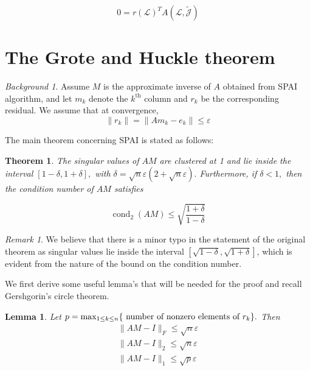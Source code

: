\documentclass[paper=A4, fontsize=11pt]{scrartcl}
\let\originalleft\left
\let\originalright\right
\renewcommand{\left}{\mathopen{}\mathclose\bgroup\originalleft}
\renewcommand{\right}{\aftergroup\egroup\originalright}
\newtheorem{lemma}{Lemma}[section]
\newtheorem{theorem}{Theorem}[section]
\theoremstyle{remark}
\newtheorem*{rem}{Remark}
\newtheorem*{bgd}{Background}
\begin{document}
\begin{equation}
0=r(\mathcal{L})^{T} A(\mathcal{L}, \tilde{\mathcal{J}})
\end{equation}

\newpage
	
	
\section{The Grote and Huckle theorem}

\begin{bgd} Assume $M$ is the approximate inverse of $A$ obtained from SPAI algorithm, and let $m_k$ denote the $k^{\text{th}}$ column and $r_k$ be the corresponding residual. We assume that at convergence, 
\begin{equation}\label{eq:conv}
\| r_k\| = \|A m_k- e_k\| \leq  \varepsilon 
\end{equation}
\end{bgd}
The main theorem concerning SPAI is stated as follows: 
\begin{theorem}
The singular values of \(A M\) are clustered at 1 and lie inside the
interval \([1-\delta, 1+\delta],\) with \(\delta=\sqrt{n} \varepsilon(2+\sqrt{n} \varepsilon) .\) Furthermore, if \(\delta<1,\) then the
condition number of \(A M\) satisfies

\begin{equation}
\operatorname{cond}_{2}(A M) \leq \sqrt{\frac{1+\delta}{1-\delta}}
\end{equation}


\end{theorem}

\begin{rem}
We believe that there is a minor typo in the statement of the original theorem as singular values lie inside the interval  \([\sqrt{1-\delta}, \sqrt{1+\delta}]\), which is evident from the nature of the bound on the condition number. 
\end{rem}

We first derive some useful lemma's that will be needed for the proof and recall Gershgorin's circle theorem. 

\begin{lemma}\label{lma:norms}
Let \(p=\max _{1 \leq k \leq n}\left\{\text { number of nonzero elements of } r_{k}\right\} .\) Then
\begin{align}
\|A M-I\|_{F} \leq \sqrt{n} \varepsilon \label{lem1a} \\
\|A M-I\|_{2} \leq \sqrt{n} \varepsilon \label{lem1b} \\
\|A M-I\|_{1}  \leq \sqrt{p} \varepsilon \label{lem1c}
\end{align}
\end{lemma}
\end{document}

